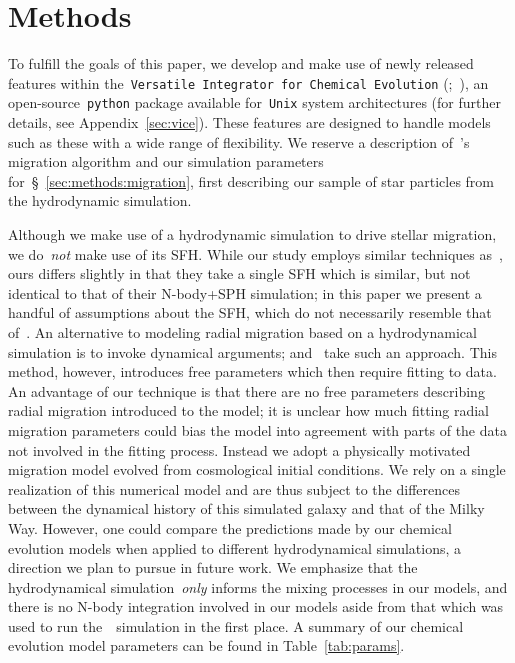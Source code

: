 \documentclass[draft2.tex]{subfiles}
\begin{document}
 

\section{Methods} 
\label{sec:methods} 
To fulfill the goals of this paper, we develop and make use of newly released 
features within the~\texttt{Versatile Integrator for Chemical Evolution} 
(\vice;~\citealp{Johnson2020}), an open-source~\texttt{python} package 
available for~\texttt{Unix} system architectures (for further details, see 
Appendix~\ref{sec:vice}). 
These features are designed to handle models such as these with a wide range of 
flexibility. 
We reserve a description of~\vice's migration algorithm and our simulation 
parameters for~\S~\ref{sec:methods:migration}, first describing our sample of 
star particles from the hydrodynamic simulation. 
\par 
Although we make use of a hydrodynamic simulation to drive stellar migration, 
we do~\textit{not} make use of its SFH. 
While our study employs similar techniques as~\citet{Minchev2013}, ours differs 
slightly in that they take a single SFH which is similar, but not identical to 
that of their N-body+SPH simulation; in this paper we present a handful of 
assumptions about the SFH, which do not necessarily resemble that of~\hsim. 
An alternative to modeling radial migration based on a 
hydrodynamical simulation is to invoke dynamical arguments; 
\citet{Schoenrich2009a} and~\citet{Sharma2020} take such an approach. 
This method, however, introduces free parameters which then require fitting to 
data. 
An advantage of our technique is that there are no free parameters describing 
radial migration introduced to the model; it is unclear how much 
fitting radial migration parameters could bias the model into agreement with 
parts of the data not involved in the fitting process. 
Instead we adopt a physically motivated migration model evolved from 
cosmological initial conditions. 
We rely on a single realization of this numerical model and are thus subject to 
the differences between the dynamical history of this simulated galaxy and that 
of the Milky Way. 
However, one could compare the predictions made by our chemical evolution 
models when applied to different hydrodynamical simulations, a direction we 
plan to pursue in future work. 
We emphasize that the hydrodynamical simulation~\textit{only} informs the 
mixing processes in our models, and there is no N-body integration involved in 
our models aside from that which was used to run the~\hsim~simulation in the 
first place. 
A summary of our chemical evolution model parameters can be found in 
Table~\ref{tab:params}. 
\end{document}
